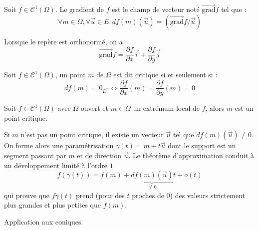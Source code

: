 \begin{defi}[gradient]
 Soit $f\in \mathcal C^1(\Omega)$. Le gradient de $f$ est le champ de vecteur noté $\overrightarrow{\mathrm{grad}}f$ tel que :
\begin{displaymath}
 \forall m\in \Omega , \forall \overrightarrow u \in E :
df(m)(\overrightarrow u) = (\overrightarrow{\mathrm{grad}}f / \overrightarrow u)
\end{displaymath}
\end{defi}
\begin{rem}
 Lorsque le repère est orthonormé, on a :
\begin{displaymath}
 \overrightarrow{\mathrm{grad}}f = \dfrac{\partial f}{\partial x}\overrightarrow i +
\dfrac{\partial f}{\partial y}\overrightarrow j
\end{displaymath}
\end{rem}
\begin{defi}
 Soit $f\in \mathcal C^1(\Omega)$, un point $m$ de $\Omega$ est dit critique si et seulement si :
\begin{displaymath}
 df(m)=0_{E^*}\Leftrightarrow \dfrac{\partial f}{\partial x}(m)=\dfrac{\partial f}{\partial y}(m)=0
\end{displaymath}
\end{defi}
\begin{prop}
 Soit $f\in \mathcal C^1(\Omega)$ avec $\Omega$ ouvert et $m\in \Omega$ un extrémum local de $f$, alors $m$ est un point critique.
\end{prop}
\begin{demo}
 Si $m$ n'est pas un point critique, il existe un vecteur $\overrightarrow u$ tel que $df(m)(\overrightarrow u)\neq 0$. On forme alors une paramétrisation $\gamma(t)=m+t\overrightarrow u$ dont le support est un segment passant par $m$ et de direction $\overrightarrow u$. Le théorème d'approximation conduit à un développement limité à l'ordre $1$
\begin{displaymath}
 f(\gamma(t)) = f(m) +\underset{\neq 0}{\underbrace{df(m)(\overrightarrow u)}} t +o(t)
\end{displaymath}
qui prouve que $f\gamma(t)$ prend (pour des $t$ proches de $0$) des valeurs strictement plus grandes et plus petites que $f(m)$.
\end{demo}
Application aux coniques.


